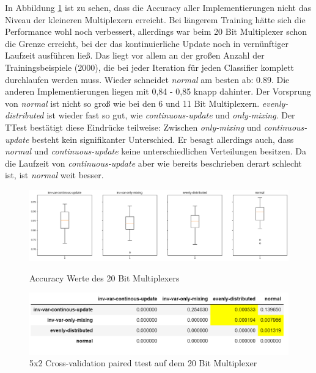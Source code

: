 \documentclass{ocsmnar}
\begin{document}
In Abbildung \ref{boxplot-20-bit} ist zu sehen, dass die Accuracy aller Implementierungen nicht das Niveau der kleineren Multiplexern erreicht. Bei längerem Training hätte sich die Performance wohl noch verbessert, allerdings war beim 20 Bit Multiplexer schon die Grenze erreicht, bei der das kontinuierliche Update noch in vernünftiger Laufzeit ausführen ließ. Das liegt vor allem an der großen Anzahl der Trainingsbeispiele (2000), die bei jeder Iteration für jeden Classifier komplett durchlaufen werden muss. 
Wieder schneidet \textit{normal} am besten ab: 0.89. Die anderen Implementierungen liegen mit 0,84 - 0,85 knapp dahinter. Der Vorsprung von \textit{normal} ist nicht so groß wie bei den 6 und 11 Bit Multiplexern.
\textit{evenly-distributed} ist wieder fast so gut, wie \textit{continuous-update} und \textit{only-mixing}.  
Der TTest bestätigt diese Eindrücke teilweise: Zwischen \textit{only-mixing} und \textit{continuous-update} besteht kein signifikanter Unterschied. Er besagt allerdings auch, dass \textit{normal} und \textit{continuous-update} keine unterschiedlichen Verteilungen besitzen. Da die Laufzeit von \textit{continuous-update} aber wie bereits beschrieben derart schlecht ist, ist \textit{normal} weit besser. 


\begin{figure}[h]
    \includegraphics[width=\linewidth]{img/boxplot_20_bit.png}
    \caption{Accuracy Werte des 20 Bit Multiplexers}
    \label{boxplot-20-bit}
\end{figure}


\begin{figure}[h]
    \includegraphics[width=\linewidth]{img/ttest_20_bit.png}
    \caption{5x2 Cross-validation paired ttest auf dem 20 Bit Multiplexer}\label{ttest-20-bit}
\end{figure}
\end{document}
